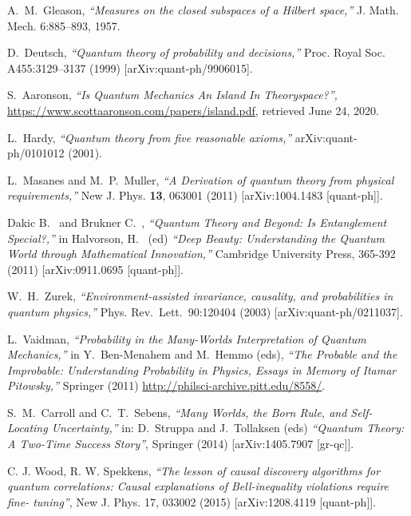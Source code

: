 \documentclass[12pt]{article}
\begin{document}
\begin{thebibliography}{99}
\small{

A.~M.~Gleason, {\sl ``Measures on the closed subspaces of a Hilbert space,''} J. Math. Mech. 6:885–893, 1957.

 D.~Deutsch, {\sl ``Quantum theory of probability and decisions,''} Proc. Royal Soc. A455:3129–3137 (1999)
[arXiv:quant-ph/9906015].



S.~Aaronson, {\sl ``Is Quantum Mechanics An Island In Theoryspace?'',} {\url{https://www.scottaaronson.com/papers/island.pdf}}, retrieved June 24, 2020. 

 L.~Hardy, {\sl ``Quantum theory from five reasonable axioms,''} arXiv:quant-ph/0101012 (2001). 

L.~Masanes and M.~P.~Muller,
{\sl ``A Derivation of quantum theory from physical requirements,''}
New J. Phys. \textbf{13}, 063001 (2011)
[arXiv:1004.1483 [quant-ph]].

Dakic B.~ and Brukner C.~, 
{\sl ``Quantum Theory and Beyond: Is Entanglement Special?,''} in Halvorson, H.~ (ed) {\sl ``Deep Beauty: Understanding the Quantum World through Mathematical Innovation,''} Cambridge University Press, 365-392 (2011) [arXiv:0911.0695 [quant-ph]].

 W.~H.~Zurek, {\sl ``Environment-assisted invariance, causality, and probabilities in quantum physics,''} Phys.
Rev.\ Lett.\ 90:120404 (2003) [arXiv:quant-ph/0211037].


 L.~Vaidman, {\sl ``Probability in the Many-Worlds Interpretation of Quantum Mechanics,''}
in Y.~Ben-Menahem and M.~Hemmo (eds), {\sl ``The Probable and the Improbable: Understanding Probability in Physics, Essays in Memory of Itamar Pitowsky,''} Springer (2011) {\url{http://philsci-archive.pitt.edu/8558/}}.

S.~M.~Carroll and C.~T.~Sebens,
{\sl ``Many Worlds, the Born Rule, and Self-Locating Uncertainty,''}  in: D.~Struppa and J.~Tollaksen (eds) {\sl ``Quantum Theory: A Two-Time Success Story''}, Springer (2014)
[arXiv:1405.7907 [gr-qc]].

C. J. Wood, R. W. Spekkens, {\sl ``The lesson of causal discovery algorithms for quantum correlations: Causal explanations of Bell-inequality violations require fine- tuning''}, New J. Phys. 17, 033002 (2015) [arXiv:1208.4119 [quant-ph]].

}
\end{thebibliography}
\end{document}
